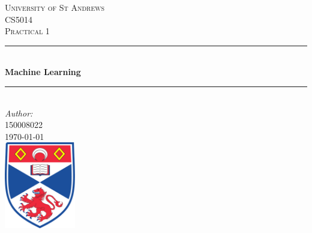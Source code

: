 \documentclass[12pt]{article}
\begin{document}
\begin{titlepage}

\newcommand{\HRule}{\rule{\linewidth}{0.5mm}} %

\center %
 

\textsc{\LARGE University of St Andrews}\\[1.5cm] %
\textsc{\Large CS5014 }\\[0.5cm] %
\textsc{\large Practical 1}\\[0.5cm] %


\HRule \\[0.4cm]
{ \huge \bfseries Machine Learning}\\[0.4cm] %
\HRule \\[1.5cm]
 


\Large \emph{Author:}\\
 \textsc{150008022}\\[3cm] %


{\large \today}\\[2cm] %


\includegraphics[width = 3.1cm]{images/standrewslogo.png}
 

\vfill %

\end{titlepage}
\end{document}
